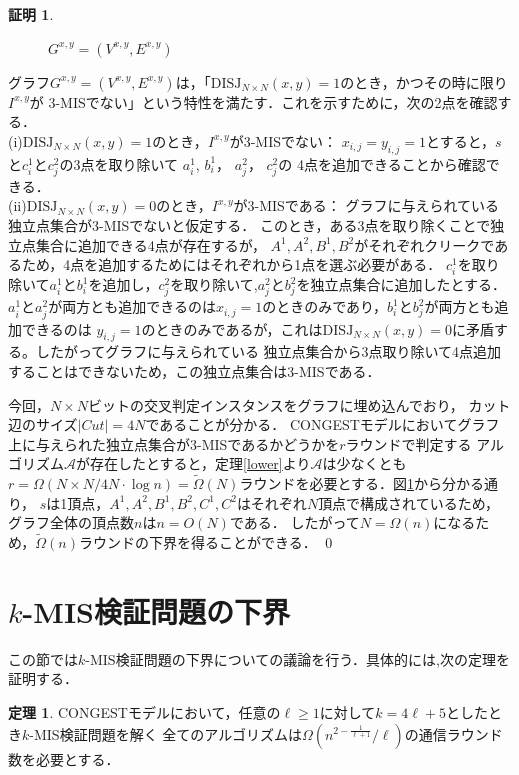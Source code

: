 \documentclass[12pt]{thesis}
\newcommand{\CONGEST}{\textsf{CONGEST}}
\theoremstyle{definition}
\newtheorem{theorem}{定理}[chapter]
\newtheorem*{prf*}{証明}
\begin{document}
\begin{prf*}
\begin{figure}[ht]
\begin{center}
\end{center}
\caption{$G^{x, y} = (V^{x,y}, E^{x,y})$}
\label{3_G(x,y)}
\end{figure}
グラフ$G^{x, y} = (V^{x,y}, E^{x,y})$は，「$\mathrm{DISJ}_{N \times N} (x, y) = 1$のとき，かつその時に限り$I^{x,y}$が
3-MISでない」という特性を満たす．これを示すために，次の2点を確認する． \\
(i)$\mathrm{DISJ}_{N \times N} (x, y) = 1$のとき，$I^{x,y}$が3-MISでない： 
$x_{i, j} = y_{i, j} =1$とすると，$s$と$c_{i}^{1}$と$c_{j}^{2}$の3点を取り除いて
$a_{i}^{1}$, $b_{i}^{1}$， $a_{j}^{2}$， $c_{j}^{2}$の
4点を追加できることから確認できる． \\
(ii)$\mathrm{DISJ}_{N \times N} (x, y) = 0$のとき，$I^{x,y}$が3-MISである： 
グラフに与えられている独立点集合が3-MISでないと仮定する．
このとき，ある3点を取り除くことで独立点集合に追加できる4点が存在するが，
$A^{1}, A^{2}, B^{1}, B^{2}$がそれぞれクリークであるため，4点を追加するためにはそれぞれから1点を選ぶ必要がある．
$c_{i}^{1}$を取り除いて$a_{i}^{1}$と$b_{i}^{1}$を追加し，$c_{j}^{2}$を取り除いて,$a_{j}^{2}$と$b_{j}^{2}$を独立点集合に追加したとする．
$a_{i}^{1}$と$a_{j}^{2}$が両方とも追加できるのは$x_{i, j} = 1$のときのみであり，$b_{i}^{1}$と$b_{j}^{2}$が両方とも追加できるのは
$y_{i, j} = 1$のときのみであるが，これは$\mathrm{DISJ}_{N \times N} (x, y) = 0$に矛盾する。したがってグラフに与えられている
独立点集合から3点取り除いて4点追加することはできないため，この独立点集合は3-MISである．

今回，$N \times N$ビットの交叉判定インスタンスをグラフに埋め込んでおり，
カット辺のサイズ$|\mathit{Cut}| = 4N$であることが分かる．
{\CONGEST}モデルにおいてグラフ上に与えられた独立点集合が3-MISであるかどうかを$r$ラウンドで判定する
アルゴリズム$\mathcal{A}$が存在したとすると，定理\ref{lower}より$\mathcal{A}$は少なくとも
$r = \Omega (N \times N/ 4N \cdot \log n) = \tilde{\Omega}(N)$ラウンドを必要とする．図\ref{3_G(x,y)}から分かる通り，
$s$は1頂点，$A^{1}, A^{2}, B^{1}, B^{2}, C^{1}, C^{2}$はそれぞれ$N$頂点で構成されているため，
グラフ全体の頂点数$n$は$n = O(N)$である．
したがって$N = \Omega(n)$になるため，$\tilde{\Omega}(n)$ラウンドの下界を得ることができる． \qed
\end{prf*}
\newpage

\section{$k$-MIS検証問題の下界}
この節では$k$-MIS検証問題の下界についての議論を行う．具体的には,次の定理を証明する．
\begin{theorem}
{\CONGEST}モデルにおいて，任意の$\ell \geq 1$に対して$k = 4\ell + 5$としたとき$k$-MIS検証問題を解く
全てのアルゴリズムは$\Omega\left(n^{2 - \frac{1}{\ell+1}}/\ell \right)$の通信ラウンド数を必要とする．
\end{theorem}
\end{document}
